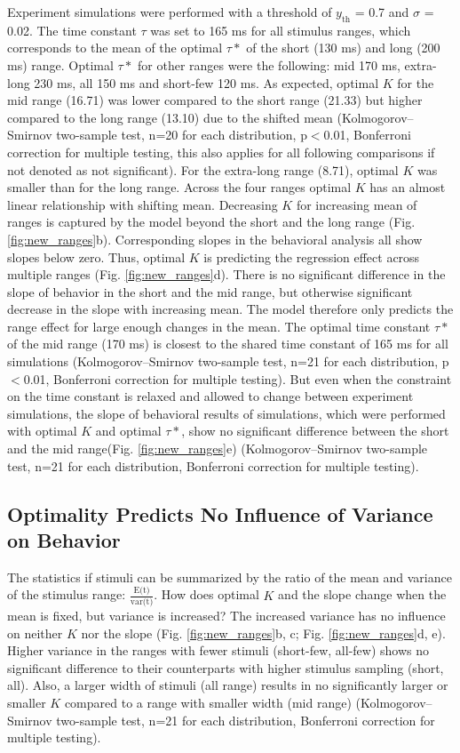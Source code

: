 \documentclass[10pt]{article}
\begin{document}
Experiment simulations were performed with a threshold of $y_{\text{th}}$ = 0.7 and $\sigma$ = 0.02. The time constant $\tau$  was set to 165 ms for all stimulus ranges, which corresponds to the mean of the optimal $\tau*$ of the short (130 ms) and long (200 ms) range. 
Optimal $\tau*$ for other ranges were the following: mid 170 ms, extra-long 230 ms, all 150 ms and short-few 120 ms. 
As expected, optimal $K$ for the mid range (16.71) was lower compared to the short range (21.33) but higher compared to the long range (13.10) due to the shifted mean 
(Kolmogorov–Smirnov two-sample test, n=20 for each distribution, p$<$0.01, Bonferroni correction for multiple testing, this also applies for all following comparisons if not denoted as not significant).
For the extra-long range (8.71), optimal $K$ was smaller than for the long range.
Across the four ranges optimal $K$ has an almost linear relationship with shifting mean.
Decreasing $K$ for increasing mean of ranges is captured by the model beyond the short and the long range (Fig. \ref{fig:new_ranges}b).
Corresponding slopes in the behavioral analysis all show slopes below zero. Thus, optimal $K$ is predicting the regression effect across multiple ranges (Fig. \ref{fig:new_ranges}d). 
There is no significant difference in the slope of behavior in the short and the mid range, but otherwise significant decrease in the slope with increasing mean. The model therefore only predicts the range effect for large enough changes in the mean. 
The optimal time constant $\tau*$ of the mid range (170 ms) is closest to the shared time constant of 165 ms for all simulations
(Kolmogorov–Smirnov two-sample test, n=21 for each distribution, p$<$0.01, Bonferroni correction for multiple testing).
But even when the constraint on the time constant is relaxed and allowed to change between experiment simulations, the slope of behavioral results of simulations, which were performed with optimal $K$ and optimal $\tau*$, show no significant difference between the short and the mid range(Fig. \ref{fig:new_ranges}e)
(Kolmogorov–Smirnov two-sample test, n=21 for each distribution, Bonferroni correction for multiple testing).

\subsection{Optimality Predicts No Influence of Variance on Behavior}
The statistics if stimuli can be summarized by the ratio of the mean and variance of the stimulus range: $\frac{\text{E(t)}}{\text{var(t)}}$.
How does optimal $K$ and the slope change when the mean is fixed, but variance is increased?
The increased variance has no influence on neither $K$ nor the slope (Fig. \ref{fig:new_ranges}b, c; Fig. \ref{fig:new_ranges}d, e).
Higher variance in the ranges with fewer stimuli (short-few, all-few) shows no significant difference to their counterparts with higher stimulus sampling (short, all).
Also, a larger width of stimuli (all range) results in no significantly larger or smaller $K$ compared to a range with smaller width (mid range) 
(Kolmogorov–Smirnov two-sample test, n=21 for each distribution, Bonferroni correction for multiple testing).
\end{document}
